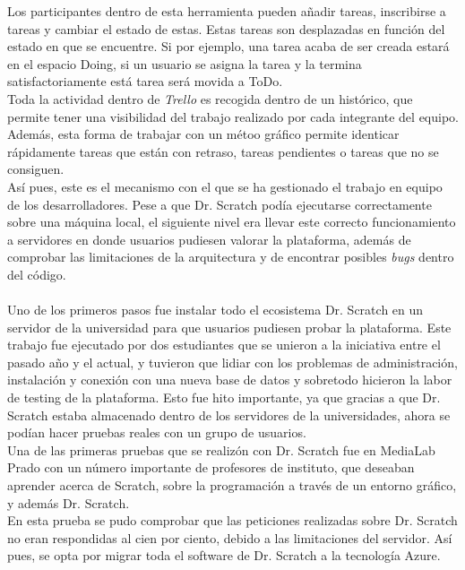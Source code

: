 \documentclass[a4paper, 12pt]{book}
\begin{document}
Los participantes dentro de esta herramienta pueden añadir tareas, inscribirse
a tareas y cambiar el estado de estas. Estas tareas son desplazadas en función
del estado en que se encuentre. Si por ejemplo, una tarea acaba de ser creada
estará en el espacio Doing, si un usuario se asigna la tarea y la termina 
satisfactoriamente está tarea será movida a ToDo. \\

Toda la actividad dentro de \emph{Trello} es recogida dentro de un histórico,
que permite tener una visibilidad del trabajo realizado por cada integrante del
equipo. Además, esta forma de trabajar con un métoo gráfico permite identicar
rápidamente tareas que están con retraso, tareas pendientes o tareas que no
se consiguen. \\

Así pues, este es el mecanismo con el que se ha gestionado el trabajo en equipo
de los desarrolladores. Pese a que Dr. Scratch podía ejecutarse correctamente
sobre una máquina local, el siguiente nivel era llevar este correcto funcionamiento 
a servidores en donde usuarios pudiesen valorar la plataforma, además de comprobar 
las limitaciones de la arquitectura y de encontrar posibles \emph{bugs} dentro del código. \\ \\

Uno de los primeros pasos fue instalar todo el ecosistema Dr. Scratch en un servidor de 
la universidad para que usuarios pudiesen probar la plataforma. Este trabajo fue 
ejecutado por dos estudiantes que se unieron a la iniciativa entre el pasado año y el 
actual, y tuvieron que lidiar con los problemas de administración, instalación y 
conexión con una nueva base de datos y sobretodo hicieron la labor de testing de la 
plataforma. Esto fue hito importante, ya que gracias a que Dr. Scratch estaba almacenado
dentro de los servidores de la universidades, ahora se podían hacer pruebas reales
con un grupo de usuarios. \\

Una de las primeras pruebas que se realizón con Dr. Scratch fue en MediaLab Prado con
un número importante de profesores de instituto, que deseaban aprender acerca de 
Scratch, sobre la programación a través de un entorno gráfico, y además Dr. Scratch. \\

En esta prueba se pudo comprobar que las peticiones realizadas sobre Dr. Scratch no 
eran respondidas al cien por ciento, debido a las limitaciones del servidor. Así pues,
se opta por migrar toda el software de Dr. Scratch a la tecnología Azure. \\
\end{document}

